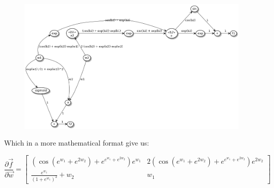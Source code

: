 

\begin{figure}
    \begin{center}
        \includegraphics[width=.6\textwidth]{computation_graph_backward.png}
        \label{Backward gradient decent on $\vec{f}$}
    \end{center}
\end{figure}

Which in a more mathematical format give us:

\[
    \frac{\partial \vec{f}}{\partial \vec{w}} =
    \begin{bmatrix}
        ( \cos(e^{w_1} + e^{2 w_2}) + e^{e^{w_1} + e^{2 w_2}} ) e^{w_1}   &   2 ( \cos(e^{w_1} + e^{2 w_2}) + e^{e^{w_1} + e^{2 w_2}} ) e^{2 w_2} \\
        \frac{e^{w_1}}{(1 + e^{w_1})^2} + w_2                             &   w_1
    \end{bmatrix}
\]
